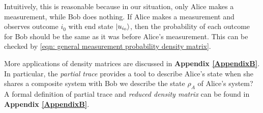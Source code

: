 Intuitively, this is reasonable because in our situation, only Alice makes a measurement, while Bob does nothing.  If Alice makes a measurement and observes outcome $i_0$ with end state $\ket{u_{i_0}}$, then the probability of each outcome for Bob should be the same as it was before Alice's measurement.  This can be checked by \eqref{eqn: general measurement probability density matrix}.

More applications of density matrices are discussed in \textbf{Appendix \ref{AppendixB}}.  In particular, the  \textit{partial trace} provides a tool to describe Alice's state when she shares a composite system with Bob we describe the state $\rho_A$ of Alice's system? A formal definition of partial trace and \textit{reduced density matrix} can be found in \textbf{Appendix \ref{AppendixB}}.





